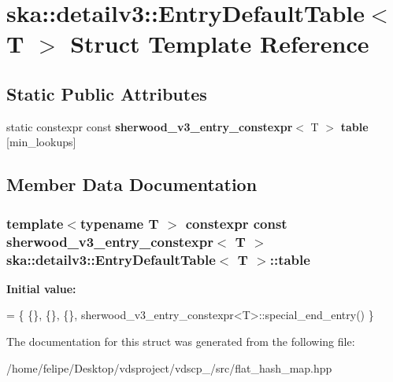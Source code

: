 \section{ska\+:\+:detailv3\+:\+:Entry\+Default\+Table$<$ T $>$ Struct Template Reference}
\label{structska_1_1detailv3_1_1EntryDefaultTable}
\subsection*{Static Public Attributes}
\begin{DoxyCompactItemize}
\item 
static constexpr const {\bf sherwood\+\_\+v3\+\_\+entry\+\_\+constexpr}$<$ T $>$ {\bfseries table} [min\+\_\+lookups]
\end{DoxyCompactItemize}


\subsection{Member Data Documentation}
\subsubsection[{table}]{\setlength{\rightskip}{0pt plus 5cm}template$<$typename T $>$ constexpr const {\bf sherwood\+\_\+v3\+\_\+entry\+\_\+constexpr}$<$ T $>$ {\bf ska\+::detailv3\+::\+Entry\+Default\+Table}$<$ T $>$\+::table\hspace{0.3cm}{\ttfamily [static]}}\label{structska_1_1detailv3_1_1EntryDefaultTable_a370614f6441cfac24df1f0f90102c8e5}
{\bfseries Initial value\+:}
\begin{DoxyCode}
=
    \{
        \{\}, \{\}, \{\}, sherwood\_v3\_entry\_constexpr<T>::special\_end\_entry()
    \}
\end{DoxyCode}


The documentation for this struct was generated from the following file\+:\begin{DoxyCompactItemize}
\item 
/home/felipe/\+Desktop/vdsproject/vdscp\+\_/src/flat\+\_\+hash\+\_\+map.\+hpp\end{DoxyCompactItemize}
